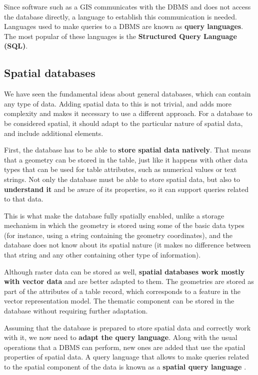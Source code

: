 Since software such as a GIS communicates with the DBMS and does not access the database directly, a language to establish this communication is needed. Languages used to make queries to a DBMS are known as \textbf{query languages}. The most popular of these languages is the \textbf{Structured Query Language (SQL)}.

\subsection{Spatial databases}

We have seen the fundamental ideas about general databases, which can contain any type of data. Adding spatial data to this is not trivial, and adds more complexity and makes it necessary to use a different approach. For a database to be considered spatial, it should adapt to the particular nature of spatial data, and include additional elements.

First, the database has to be able to \textbf{store spatial data natively}. That means that a geometry can be stored in the table, just like it happens with other data types that can be used for table attributes, such as numerical values or text strings. Not only the database must be able to store spatial data, but also to \textbf{understand it} and be aware of its properties, so it can support queries related to that data. 

This is what make the database fully spatially enabled, unlike a storage mechanism in which the geometry is stored using some of the basic data types (for instance, using a string containing the geometry coordinates), and the database does not know about its spatial nature (it makes no difference between that string and any other containing other type of information).

Although raster data can be stored as well, \textbf{spatial databases work mostly with vector data} and are better adapted to them. The geometries are stored as part of the attributes of a table record, which corresponds to a feature in the vector representation model. The thematic component can be stored in the database without requiring further adaptation.

Assuming that the database is prepared to store spatial data and correctly work with it, we now need to \textbf{adapt the query language}. Along with the usual operations that a DBMS can perform, new ones are added that use the spatial properties of spatial data. A query language that allows to make queries related to the spatial component of the data is known as a \textbf{spatial query language} .


